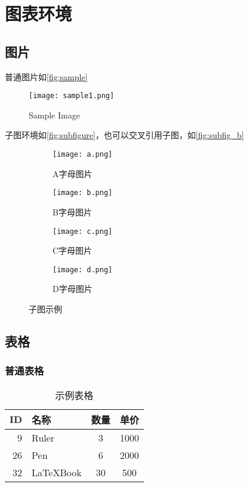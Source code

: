 \section{图表环境}
\subsection{图片}
普通图片如\autoref{fig:sample}
\begin{figure}[H]
    \centering
    \texttt{[image: sample1.png]}
    \caption{Sample Image}
    \label{fig:sample}
\end{figure}

子图环境如\autoref{fig:subfigure}，也可以交叉引用子图，如\autoref{fig:subfig_b}

\begin{figure}[H]
    \begin{subfigure}{0.24\linewidth}
        \texttt{[image: a.png]}
        \caption{A字母图片}
    \end{subfigure}
    \hfill
    \begin{subfigure}{0.24\linewidth}
        \texttt{[image: b.png]}
        \caption{B字母图片}
        \label{fig:subfig_b}
    \end{subfigure}
    \hfill
    \begin{subfigure}{0.24\linewidth}
        \texttt{[image: c.png]}
        \caption{C字母图片}
    \end{subfigure}
    \hfill
    \begin{subfigure}{0.24\linewidth}
        \texttt{[image: d.png]}
        \caption{D字母图片}
    \end{subfigure}
    \caption{子图示例}
    \label{fig:subfigure}
\end{figure}

\subsection{表格}
\subsubsection{普通表格}
\begin{table}[htbp]
    \centering
    \caption{示例表格}
    \begin{tabular}{rlcc}
        \toprule
        ID & 名称        & 数量 & 单价 \\
        \midrule
        9  & Ruler       & 3    & 1000 \\
        26 & Pen         & 6    & 2000 \\
        32 & \LaTeX Book & 30   & 500  \\
        \bottomrule
    \end{tabular}
    \label{tab:}
\end{table}

